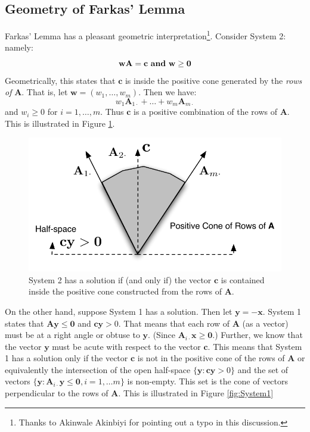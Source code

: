 \subsection{Geometry of Farkas' Lemma}
Farkas' Lemma has a pleasant geometric interpretation\footnote{Thanks to Akinwale Akinbiyi for pointing out a typo in this discussion.}. Consider System 2: namely:
\begin{displaymath}
\mathbf{w}\mathbf{A} = \mathbf{c}\text{ \textbf{and} } \mathbf{w} \geq \mathbf{0}
\end{displaymath}
Geometrically, this states that $\mathbf{c}$ is inside the positive cone generated by the \textit{rows of} $\mathbf{A}$. That is, let $\mathbf{w} = (w_1,\dots,w_m)$. Then we have:
\begin{equation}
w_1 \mathbf{A}_{1\cdot} + \dots + w_m \mathbf{A}_{m\cdot}
\end{equation}
and $w_i \geq 0$ for $i=1,\dots,m$. Thus $\mathbf{c}$ is a positive combination of the rows of $\mathbf{A}$. 
This is illustrated in Figure \ref{fig:System2}.
\begin{figure}[htbp]
\centering
\includegraphics[scale=0.75]{System2.pdf}
\caption{System 2 has a solution if (and only if) the vector $\mathbf{c}$ is contained inside the positive cone constructed from the rows of $\mathbf{A}$. }
\label{fig:System2}
\end{figure}
On the other hand, suppose System 1 has a solution. Then let $\mathbf{y} = -\mathbf{x}$. System 1 states that $\mathbf{A}\mathbf{y} \leq \mathbf{0}$ and $\mathbf{c}\mathbf{y} > 0$. That means that each row of $\mathbf{A}$ (as a vector) must be at a right angle or obtuse to $\mathbf{y}$. (Since $\mathbf{A}_{i \cdot}\mathbf{x} \geq \mathbf{0}$.) Further, we know that the vector $\mathbf{y}$ must be acute with respect to the vector $\mathbf{c}$. This means that System 1 has a solution only if the vector $\mathbf{c}$ is not in the positive cone of the rows of $\mathbf{A}$ or equivalently the intersection of the open half-space $\{\mathbf{y} : \mathbf{c}\mathbf{y} > 0\}$ and the set of vectors $\{\mathbf{y} : \mathbf{A}_{i\cdot}\mathbf{y} \leq \mathbf{0}, i=1,\dots m\}$ is non-empty. This set is the cone of vectors perpendicular to the rows of $\mathbf{A}$. This is illustrated in Figure \ref{fig:System1}

